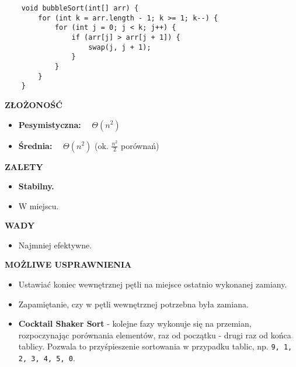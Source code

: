 \documentclass[simple-sorts.tex]{subfiles}
\begin{document}
    \begin{verbatim}
    void bubbleSort(int[] arr) {
        for (int k = arr.length - 1; k >= 1; k--) {
            for (int j = 0; j < k; j++) {
                if (arr[j] > arr[j + 1]) {
                    swap(j, j + 1);
                }
            }
        }
    }
    \end{verbatim}

    \textbf{ZŁOŻONOŚĆ}
    \begin{itemize}
        \item \textbf{Pesymistyczna:} ~~$\Theta(n^2)$
        \item \textbf{Średnia:} ~~$\Theta(n^2)$ (ok. $\frac{n^2}{2}$
            porównań)
    \end{itemize}

    \textbf{ZALETY}
    \begin{itemize}
        \item \textbf{Stabilny.}
        \item W miejscu.
    \end{itemize}

    \textbf{WADY}
    \begin{itemize}
        \item Najmniej efektywne.
    \end{itemize}

    \textbf{MOŻLIWE USPRAWNIENIA}
    \begin{itemize}
        \item Ustawiać koniec wewnętrznej pętli na miejsce ostatnio wykonanej
            zamiany.
        \item Zapamiętanie, czy  w pętli wewnętrznej potrzebna była zamiana.
        \item \textbf{Cocktail Shaker Sort} - kolejne fazy wykonuje się na
            przemian, rozpoczynając porównania elementów, raz od początku -
            drugi raz od końca tablicy. Pozwala to przyśpieszenie sortowania
            w przypadku tablic, np. \texttt{9, 1, 2, 3, 4, 5, 0}.
    \end{itemize}
\end{document}
